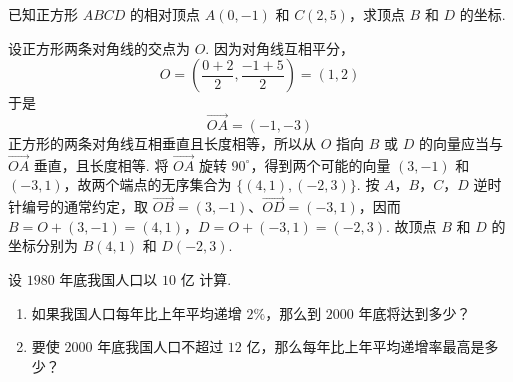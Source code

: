 \documentclass[UTF8,a4paper,oneside,11pt]{ctexbook}
\begin{document}
\begin{problem}
已知正方形 \(ABCD\) 的相对顶点 \(A(0,-1)\) 和 \(C(2,5)\)，求顶点 \(B\) 和 \(D\) 的坐标.
\end{problem}

\begin{solution}
设正方形两条对角线的交点为 \(O\). 因为对角线互相平分，
\[
O=\left(\frac{0+2}{2},\frac{-1+5}{2}\right)=(1,2)
\]
于是
\[
\overrightarrow{OA}=(-1,-3)
\]
正方形的两条对角线互相垂直且长度相等，所以从 \(O\) 指向 \(B\) 或 \(D\) 的向量应当与 \(\overrightarrow{OA}\) 垂直，且长度相等. 将 \(\overrightarrow{OA}\) 旋转 \(90^{\circ}\)，得到两个可能的向量 \((3,-1)\) 和 \((-3,1)\)，故两个端点的无序集合为 \(\{(4,1),(-2,3)\}\). 按 \(A\)，\(B\)，\(C\)，\(D\) 逆时针编号的通常约定，取 \(\overrightarrow{OB}=(3,-1)\)、\(\overrightarrow{OD}=(-3,1)\)，因而
\(B=O+(3,-1)=(4,1)\)，\(D=O+(-3,1)=(-2,3)\).
故顶点 \(B\) 和 \(D\) 的坐标分别为 \(B(4,1)\) 和 \(D(-2,3)\).
\end{solution}

\begin{problem}
设 \(1980\) 年底我国人口以 \(10\text{ 亿}\) 计算.

\begin{enumerate}
\item 如果我国人口每年比上年平均递增 \(2\%\)，那么到 \(2000\) 年底将达到多少？
\item 要使 \(2000\) 年底我国人口不超过 \(12\text{ 亿}\)，那么每年比上年平均递增率最高是多少？
\end{enumerate}

\begin{center}
\end{center}
\end{problem}
\end{document}
